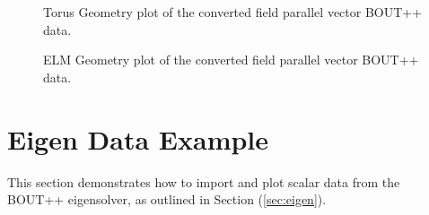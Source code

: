 \documentclass[12pt,a4paper]{article}
\begin{document}
\begin{figure}[H]
	\centering
	\caption{Torus Geometry plot of the converted field parallel vector BOUT++ data.}
	\label{fig:torus_vector}
\end{figure}

\begin{figure}[H]
	\centering
	\caption{ELM Geometry plot of the converted field parallel vector BOUT++ data.}
	\label{fig:elm_vector}
\end{figure}

\section{Eigen Data Example}
\label{example:eigen}
This section demonstrates how to import and plot scalar data from the BOUT++ eigensolver, as outlined in Section (\ref{sec:eigen}).
\end{document}
